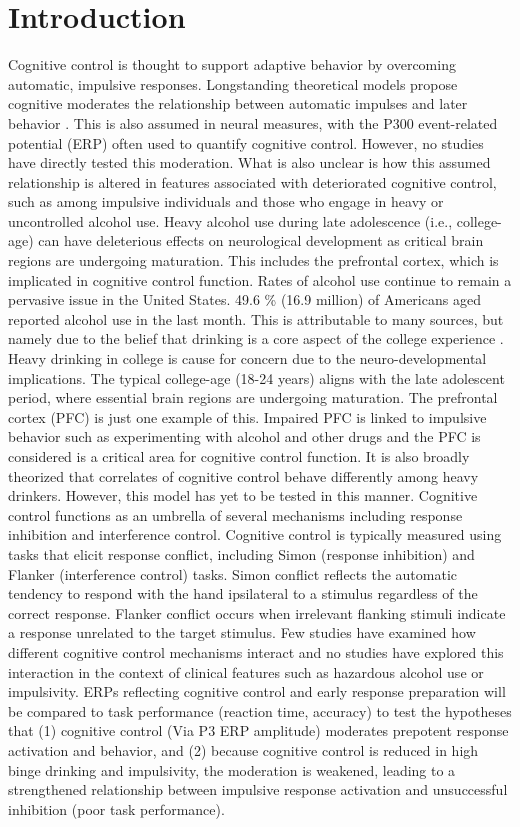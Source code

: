 \section{Introduction}

Cognitive control is thought to support adaptive behavior by overcoming automatic, impulsive responses. Longstanding theoretical models propose cognitive moderates the relationship between automatic impulses and later behavior \citep{diamond13}. This is also assumed in neural measures, with the P300 event-related potential (ERP) often used to quantify cognitive control. However, no studies have directly tested this moderation. What is also unclear is how this assumed relationship is altered in features associated with deteriorated cognitive control, such as among impulsive individuals and those who engage in heavy or uncontrolled alcohol use. Heavy alcohol use during late adolescence (i.e., college-age) can have deleterious effects on neurological development as critical brain regions are undergoing maturation. This includes the prefrontal cortex, which is implicated in cognitive control function. Rates of alcohol use continue to remain a pervasive issue in the United States. 49.6 \% (16.9 million) of Americans aged reported alcohol use in the last month. This is attributable to many sources, but namely due to the belief that drinking is a core aspect of the college experience \citep{tan12}. Heavy drinking in college is cause for concern due to the neuro-developmental implications. The typical college-age (18-24 years) aligns with the late adolescent period, where essential brain regions are undergoing maturation. The prefrontal cortex (PFC) is just one example of this. Impaired PFC is linked to impulsive behavior such as experimenting with alcohol and other drugs and the PFC is considered is a critical area for cognitive control function. It is also broadly theorized that correlates of cognitive control behave differently among heavy drinkers. However, this model has yet to be tested in this manner. Cognitive control functions as an umbrella of several mechanisms including response inhibition and interference control. Cognitive control is typically measured using tasks that elicit response conflict, including Simon (response inhibition) and Flanker (interference control) tasks. Simon conflict reflects the automatic tendency to respond with the hand ipsilateral to a stimulus regardless of the correct response. Flanker conflict occurs when irrelevant flanking stimuli indicate a response unrelated to the target stimulus. Few studies have examined how different cognitive control mechanisms interact and no studies have explored this interaction in the context of clinical features such as hazardous alcohol use or impulsivity. ERPs reflecting cognitive control and early response preparation will be compared to task performance (reaction time, accuracy) to test the hypotheses that (1) cognitive control (Via P3 ERP amplitude) moderates prepotent response activation and behavior, and (2) because cognitive control is reduced in high binge drinking and impulsivity, the moderation is weakened, leading to a strengthened relationship between impulsive response activation and unsuccessful inhibition (poor task performance). 